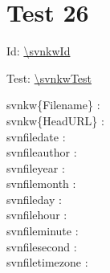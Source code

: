 \documentclass[12pt]{report}
\begin{document}
\raggedright

\chapter{Test 26}

\noindent
{}

Id: \url{\svnkwId}
\svnkwId

Test: \url{\svnkwTest}
\svnkwTest

 \noindent
 svnkw\{Filename\} :  \\
 svnkw\{HeadURL\}  :  \\
 svnfiledate : \svnfiledate  \\
 svnfileauthor : \svnfileauthor  \\
 svnfileyear : \svnfileyear  \\
 svnfilemonth : \svnfilemonth  \\
 svnfileday : \svnfileday  \\
 svnfilehour : \svnfilehour  \\
 svnfileminute : \svnfileminute  \\
 svnfilesecond : \svnfilesecond  \\
 svnfiletimezone : \svnfiletimezone  \\
\end{document}
